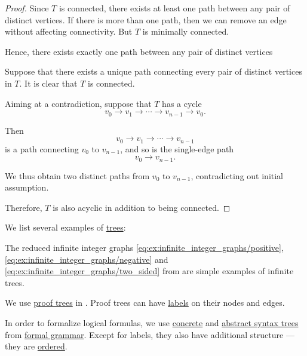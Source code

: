 \begin{proof}
  Since \( T \) is connected, there exists at least one path between any pair of distinct vertices. If there is more than one path, then we can remove an edge without affecting connectivity. But \( T \) is minimally connected.

  Hence, there exists exactly one path between any pair of distinct vertices

   Suppose that there exists a unique path connecting every pair of distinct vertices in \( T \). It is clear that \( T \) is connected.

  Aiming at a contradiction, suppose that \( T \) has a cycle
  \begin{equation*}
    v_0 \to v_1 \to \cdots \to v_{n-1} \to v_0.
  \end{equation*}

  Then
  \begin{equation*}
    v_0 \to v_1 \to \cdots \to v_{n-1}
  \end{equation*}
  is a path connecting \( v_0 \) to \( v_{n-1} \), and so is the single-edge path
  \begin{equation*}
    v_0 \to v_{n-1}.
  \end{equation*}

  We thus obtain two distinct paths from \( v_0 \) to \( v_{n-1} \), contradicting out initial assumption.

  Therefore, \( T \) is also acyclic in addition to being connected.
\end{proof}

\begin{example}\label{ex:def:tree}
  We list several examples of \hyperref[def:tree]{trees}:
  \begin{thmenum}
     The reduced infinite integer graphs \eqref{eq:ex:infinite_integer_graphs/positive}, \eqref{eq:ex:infinite_integer_graphs/negative} and \eqref{eq:ex:infinite_integer_graphs/two_sided} from  are simple examples of infinite trees.

     We use \hyperref[def:proof_tree]{proof trees} in . Proof trees can have \hyperref[def:labeled_set]{labels} on their nodes and edges.

     In order to formalize logical formulas, we use \hyperref[def:parse_tree]{concrete} and \hyperref[rem:abstract_syntax_tree]{abstract syntax trees} from \hyperref[def:formal_grammar]{formal grammar}. Except for labels, they also have additional structure --- they are \hyperref[def:ordered_tree]{ordered}.
  \end{thmenum}
\end{example}

